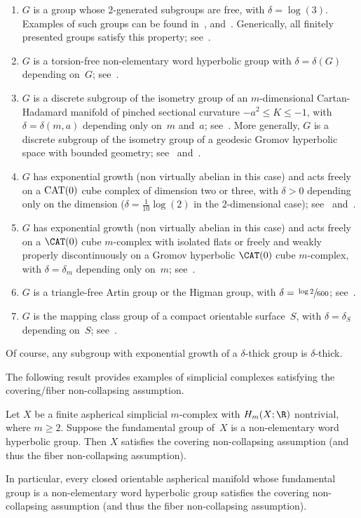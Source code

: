 \begin{enumerate}
\item $G$ is a group whose $2$-generated subgroups are free, with $\delta=\log(3)$.
Examples of such groups can be found in~\cite{guba}, \cite{bumagin} and~\cite{AO96}.
Generically, all finitely presented groups satisfy this property; see~\cite{AO96}.
\item $G$ is a torsion-free non-elementary word hyperbolic group with $\delta=\delta(G)$ depending on~$G$; see~\cite{delzant}.
\item $G$ is a discrete subgroup of the isometry group of an $m$\nobreakdash-dimensional Cartan-Hadamard manifold of pinched sectional curvature $-a^2 \leq K \leq -1$, with $\delta=\delta(m,a)$ depending only on~$m$ and~$a$; see~\cite{BCG11}.
More generally, $G$ is a discrete subgroup of the isometry group of a geodesic Gromov hyperbolic space with bounded geometry; see~\cite{BCGS} and~\cite{BF}.
\item $G$ has exponential growth (\ie non virtually abelian in this case) and acts freely on a ${\rm CAT}(0)$ cube complex of dimension two or three, with $\delta>0$ depending only on the dimension (\eg $\delta=\frac{1}{10} \log(2)$ in the $2$-dimensional case); see~\cite{KS19} and~\cite{GJN}.
\item $G$ has exponential growth (\ie non virtually abelian in this case) and acts freely on a $\CAT(0)$ cube $m$\nobreakdash-complex with isolated flats or freely and weakly properly discontinuously on a Gromov hyperbolic $\CAT(0)$ cube $m$\nobreakdash-complex, with $\delta=\delta_m$ depending only on~$m$; see~\cite{GJN}. \label{IF}
\item $G$ is a triangle-free Artin group or the Higman group, with $\delta=\sfrac{\log2}{600}$; see~\cite{GJN}.
\item $G$ is the mapping class group of a compact orientable surface~$S$, with $\delta=\delta_S$ depending on~$S$; see~\cite{man10}.
\end{enumerate}
Of course, any subgroup with exponential growth of a $\delta$-thick group is $\delta$-thick.

The following result provides examples of simplicial complexes satisfying the covering/fiber non-collapsing assumption.

\begin{proposition} \label{prop:hyp}
Let $X$ be a finite aspherical simplicial $m$\nobreakdash-complex with $H_m(X;\R)$ nontrivial, where $m \geq 2$.
Suppose the fundamental group of~$X$ is a non-elementary word hyperbolic group.
Then $X$ satisfies the covering non-collapsing assumption (and thus the fiber non-collapsing assumption).

In particular, every closed orientable aspherical manifold whose fundamental group is a non-elementary word hyperbolic group satisfies the covering non-collapsing assumption (and thus the fiber non-collapsing assumption).
\end{proposition}

